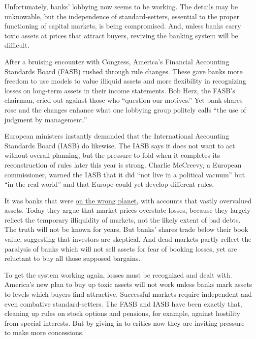 \documentclass[12pt,a4paper]{article}
\begin{document}
\begin{reading}
\begin{examtext}
Unfortunately, banks' lobbying now seems to be working. The details may be unknowable, but the independence of standard-setters, essential to the proper functioning of capital markets, is being compromised. And, unless banks carry toxic assets at prices that attract buyers, reviving the banking system will be difficult.

After a bruising encounter with Congress, America's Financial Accounting Standards Board (FASB) rushed through rule changes. These gave banks more freedom to use models to value illiquid assets and more flexibility in recognizing losses on long-term assets in their income statements. Bob Herz, the FASB's chairman, cried out against those who ``question our motives.'' Yet bank shares rose and the changes enhance what one lobbying group politely calls ``the use of judgment by management.''

European ministers instantly demanded that the International Accounting Standards Board (IASB) do likewise. The IASB says it does not want to act without overall planning, but the pressure to fold when it completes its reconstruction of rules later this year is strong. Charlie McCreevy, a European commissioner, warned the IASB that it did ``not live in a political vacuum'' but ``in the real world'' and that Europe could yet develop different rules.

It was banks that were \uline{on the wrong planet}, with accounts that vastly overvalued assets. Today they argue that market prices overstate losses, because they largely reflect the temporary illiquidity of markets, not the likely extent of bad debts. The truth will not be known for years. But banks' shares trade below their book value, suggesting that investors are skeptical. And dead markets partly reflect the paralysis of banks which will not sell assets for fear of booking losses, yet are reluctant to buy all those supposed bargains.

To get the system working again, losses must be recognized and dealt with. America's new plan to buy up toxic assets will not work unless banks mark assets to levels which buyers find attractive. Successful markets require independent and even combative standard-setters. The FASB and IASB have been exactly that, cleaning up rules on stock options and pensions, for example, against hostility from special interests. But by giving in to critics now they are inviting pressure to make more concessions.
\end{examtext}



\end{reading}
\end{document}

